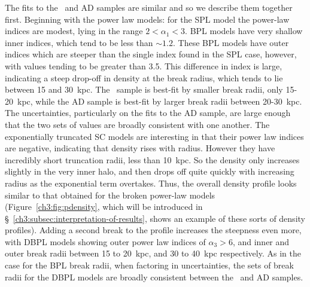 The fits to the \eLz\ and AD samples are similar and so we describe them together first. Beginning with the power law models: for the SPL model the power-law indices are modest, lying in the range $2 < \alpha_{1} < 3$. BPL models have very shallow inner indices, which tend to be less than $\sim 1.2$. These BPL models have outer indices which are steeper than the single index found in the SPL case, however, with values tending to be greater than 3.5. This difference in index is large, indicating a steep drop-off in density at the break radius, which tends to lie between 15 and 30~kpc. The \eLz\ sample is best-fit by smaller break radii, only 15-20~kpc, while the AD sample is best-fit by larger break radii between 20-30~kpc. The uncertainties, particularly on the fits to the AD sample, are large enough that the two sets of values are broadly consistent with one another. The exponentially truncated SC models are interesting in that their power law indices are negative, indicating that density rises with radius. However they have incredibly short truncation radii, less than 10~kpc. So the density only increases slightly in the very inner halo, and then drops off quite quickly with increasing radius as the exponential term overtakes. Thus, the overall density profile looks similar to that obtained for the broken power-law models (Figure~\ref{ch3:fig:pdensity}, which will be introduced in \S~\ref{ch3:subsec:interpretation-of-results}, shows an example of these sorts of density profiles). Adding a second break to the profile increases the steepness even more, with DBPL models showing outer power law indices of $\alpha_{3} > 6$, and inner and outer break radii between 15 to 20~kpc, and 30 to 40~kpc respectively. As in the case for the BPL break radii, when factoring in uncertainties, the sets of break radii for the DBPL models are broadly consistent between the \eLz\ and AD samples.

